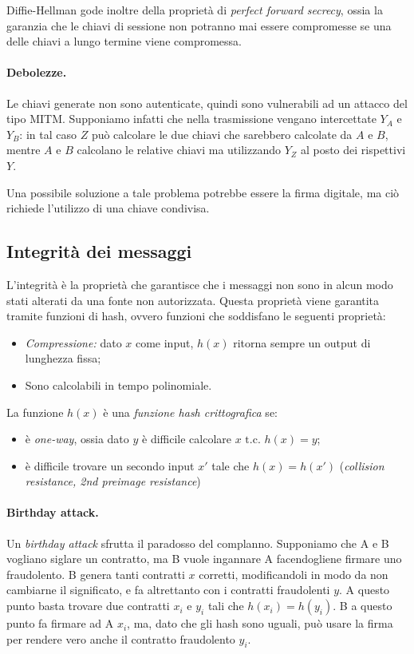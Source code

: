 \documentclass[a4paper, 10pt, twoside]{article}
\begin{document}
	Diffie-Hellman gode inoltre della proprietà di \textit{perfect forward secrecy}, ossia la garanzia che le chiavi di sessione non potranno mai essere compromesse se una delle chiavi a lungo termine viene compromessa.
	
	\paragraph{Debolezze.} Le chiavi generate non sono autenticate, quindi sono vulnerabili ad un attacco del tipo MITM.
	Supponiamo infatti che nella trasmissione vengano intercettate $Y_A$ e $Y_B$: in tal caso $Z$ può calcolare le due chiavi che sarebbero calcolate da $A$ e $B$, mentre $A$ e $B$ calcolano le relative chiavi ma utilizzando $Y_Z$ al posto dei rispettivi $Y$.
	
	Una possibile soluzione a tale problema potrebbe essere la firma digitale, ma ciò richiede l'utilizzo di una chiave condivisa.
	
	\subsection{Integrità dei messaggi}
	L'integrità è la proprietà che garantisce che i messaggi non sono in alcun modo stati alterati da una fonte non autorizzata. Questa proprietà viene garantita tramite funzioni di hash, ovvero funzioni che soddisfano le seguenti proprietà: \begin{itemize}
		\item \textit{Compressione:} dato $x$ come input, $h(x) $ ritorna sempre un output di lunghezza fissa;
		\item Sono calcolabili in tempo polinomiale.
	\end{itemize}
	
	La funzione $h(x)$ è una \textit{funzione hash crittografica} se:\begin{itemize}
		\item è \textit{one-way}, ossia dato $y$ è difficile calcolare $x \text{ t.c. } h(x) = y$;
		\item è difficile trovare un secondo input $x'$ tale che $h(x) = h(x')$ (\textit{collision resistance, 2nd preimage resistance})
	\end{itemize}
	
	\paragraph{Birthday attack.} Un \textit{birthday attack} sfrutta il paradosso del complanno. Supponiamo che A e B vogliano siglare un contratto, ma B vuole ingannare A facendogliene firmare uno fraudolento. B genera tanti contratti $x$ corretti, modificandoli in modo da non cambiarne il significato, e fa altrettanto con i contratti fraudolenti $y$. A questo punto basta trovare due contratti $x_i$ e $y_i$ tali che $h(x_i) = h(y_i)$. B a questo punto fa firmare ad A $x_i$, ma, dato che gli hash sono uguali, può usare la firma per rendere vero anche il contratto fraudolento $y_i$.
	
\end{document}
